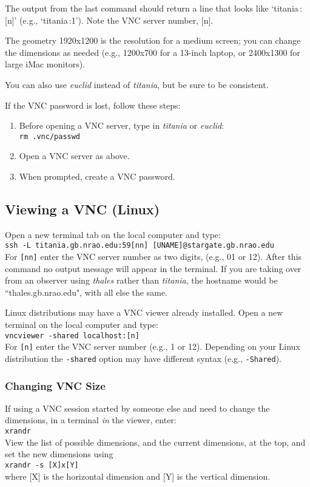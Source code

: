 \documentclass[11pt]{article}
\begin{document}
\noindent The output from the last command should return a line that looks like `titania\,:[n]' (e.g., `titania\,:1'). Note the VNC server number, [n].

\noindent The geometry 1920x1200 is the resolution for a medium screen; you can change the dimensions as needed (e.g., 1200x700 for a 13-inch laptop, or 2400x1300 for large iMac monitors).  

\noindent You can also use \textit{euclid} instead of \textit{titania}, but be sure to be consistent.

\noindent If the VNC password is lost, follow these steps: \begin{enumerate}

\item Before opening a VNC server, type in \textit{titania} or \textit{euclid}: \\
\texttt{rm .vnc/passwd}
\item Open a VNC server as above.  
\item When prompted, create a VNC password. 
\end{enumerate}


\subsection{Viewing a VNC (Linux)} \label{ssec:vncl}  %
Open a new terminal tab on the local computer and type: \\
\indent\texttt{ssh -L titania.gb.nrao.edu:59[nn] [UNAME]@stargate.gb.nrao.edu} \\
For \texttt{[nn]} enter the VNC server number as two digits, (e.g., 01 or 12). After this command no output message will appear in the terminal.  If you are taking over from an observer using \textit{thales} rather than \textit{titania}, the hostname would be ``thales.gb.nrao.edu", with all else the same.  

\noindent Linux distributions may have a VNC viewer already installed. Open a new terminal on the local computer and type: \\
\indent \texttt{vncviewer -shared localhost:[n]} \\
For \texttt{[n]} enter the VNC server number (e.g., 1 or 12). Depending on your Linux distribution the \texttt{-shared} option may have different syntax (e.g., \texttt{-Shared}).

\subsubsection{Changing VNC Size} \label{sssec:vnc}  %
\noindent If using a VNC session started by someone else and need to change the dimensions, in a terminal \textit{in} the viewer, enter: \\
\indent\texttt{xrandr} \\
View the list of possible dimensions, and the current dimensions, at the top, and set the new dimensions using \\
\indent\texttt{xrandr -s [X]x[Y]} \\
where [X] is the horizontal dimension and [Y] is the vertical dimension.
\end{document}
